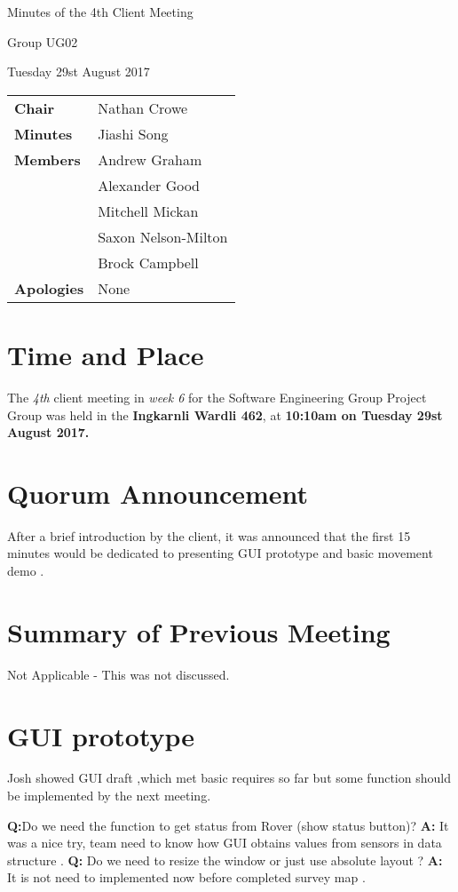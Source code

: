 \documentclass{article}
\begin{document}
\begin{center}    
{\huge Minutes of the 4th Client Meeting \par}
\vspace{0.5cm}
{\large Group UG02 \par}
\vspace{0.5cm}
{\large Tuesday 29st August 2017 \par}
\vspace{0.5cm}
\end{center}

\begin{flushleft}
\begin{tabular}{ll}
{\bfseries Chair} & Nathan Crowe \\
{\bfseries Minutes} & Jiashi Song \\
{\bfseries Members} & Andrew Graham  \\
 & Alexander Good \\
 & Mitchell Mickan \\
 & Saxon Nelson-Milton \\
 & Brock Campbell \\
{\bfseries Apologies} & None\\
\end{tabular}
\end{flushleft}

\section{Time and Place}
The {\itshape 4th} client meeting in {\itshape week 6} for the Software Engineering Group Project Group was held in the {\bfseries Ingkarnli Wardli 462}, at {\bfseries 10:10am on Tuesday 29st August 2017.} 

\section{Quorum Announcement}
	After a brief introduction by the client, it was announced that the first 15 minutes would be dedicated to presenting GUI prototype and basic movement demo .
    
\section{Summary of Previous Meeting}
 	Not Applicable - This was not discussed.

\section{GUI prototype}
Josh showed GUI draft ,which met basic requires so far but some function should be implemented by the next meeting.
\begin{flushleft}
\textbf{Q:}Do we need the function to get status from Rover (show status button)?
\linebreak\textbf{A:} It was a nice try, team need to know how GUI obtains values from  sensors in data structure .
\linebreak\textbf{Q:} Do we need to resize the window or just use absolute layout ?
\linebreak\textbf{A:} It is not need to implemented now before completed survey map .
\end{flushleft}
\end{document}
